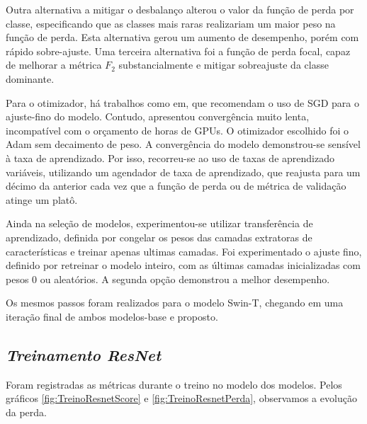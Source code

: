 Outra alternativa a mitigar o desbalanço alterou o valor da função de perda por classe, especificando que as classes mais raras realizariam um maior peso na função de perda. Esta alternativa gerou um aumento de desempenho, porém com rápido sobre-ajuste. Uma terceira alternativa foi a função de perda focal, capaz de melhorar a métrica $F_2$ substancialmente e mitigar sobreajuste da classe dominante.

Para o otimizador, há trabalhos como em\cite{https://doi.org/10.48550/arxiv.2106.10270}, que recomendam o uso de SGD para o ajuste-fino do modelo. Contudo, apresentou convergência muito lenta, incompatível com o orçamento de horas de GPUs. O otimizador escolhido foi o Adam sem decaimento de peso. A convergência do modelo demonstrou-se sensível à taxa de aprendizado. Por isso, recorreu-se ao uso de taxas de aprendizado variáveis, utilizando um agendador de taxa de aprendizado, que reajusta para um décimo da anterior cada vez que a função de perda ou de métrica de validação atinge um platô.

Ainda na seleção de modelos, experimentou-se utilizar transferência de aprendizado, definida por congelar os pesos das camadas extratoras de características e treinar apenas ultimas camadas. Foi experimentado o ajuste fino, definido por retreinar o modelo inteiro, com as últimas camadas inicializadas com pesos 0 ou aleatórios. A segunda opção demonstrou a melhor desempenho.


Os mesmos passos foram realizados para o modelo Swin-T, chegando em uma iteração final de ambos modelos-base e proposto.

\subsection{\textit{Treinamento ResNet}}\label{sec:Cap3_TrainResnet}
Foram registradas as métricas durante o treino no modelo dos modelos. Pelos gráficos \ref{fig:TreinoResnetScore} e \ref{fig:TreinoResnetPerda}, observamos a evolução da perda.



